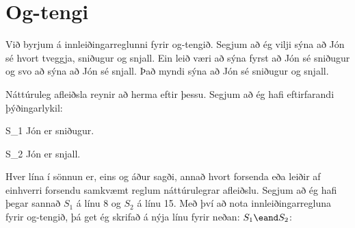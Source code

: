 %
%
%

\section{Og-tengi}
Við byrjum á innleiðingarreglunni fyrir og-tengið. Segjum að ég vilji sýna að Jón sé hvort tveggja, sniðugur og snjall. Ein leið væri að sýna fyrst að Jón sé sniðugur og svo að sýna að Jón sé snjall. Það myndi sýna að Jón sé sniðugur og snjall.

Náttúruleg afleiðsla reynir að herma eftir þessu. Segjum að ég hafi eftirfarandi þýðingarlykil:
	\begin{ekey}
		\item[S_1] Jón er sniðugur.
		\item[S_2] Jón er snjall.
	\end{ekey}	
Hver lína í sönnun er, eins og áður sagði, annað hvort forsenda eða leiðir af einhverri forsendu samkvæmt reglum náttúrulegrar afleiðslu. Segjum að ég hafi þegar sannað $S_1$ á línu 8 og $S_2$ á línu 15. Með því að nota innleiðingarregluna fyrir og-tengið, þá get ég skrifað á nýja línu fyrir neðan: $S_1 \eand S_2$:

